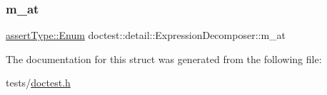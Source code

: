 \subsubsection{\texorpdfstring{m\+\_\+at}{m\_at}}
{\footnotesize\ttfamily \hyperlink{namespacedoctest_1_1assertType_ae1bb5bed722f34f1c38b83cb19d326d3}{assert\+Type\+::\+Enum} doctest\+::detail\+::\+Expression\+Decomposer\+::m\+\_\+at}



The documentation for this struct was generated from the following file\+:\begin{DoxyCompactItemize}
\item 
tests/\hyperlink{doctest_8h}{doctest.\+h}\end{DoxyCompactItemize}
